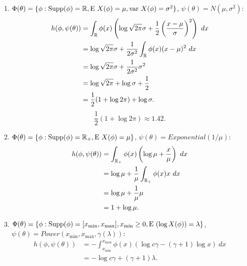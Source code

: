 \documentclass[10pt,a4paper]{article}
\theoremstyle{plain} \newtheorem{Lem}{Lemma}
\begin{document}
\begin{enumerate}

\item
$ \Phi(\theta) = \{\phi: \mathrm {Supp}(\phi)= \mathbb R, \mathrm E \  X(\phi)=\mu, \mathrm {var} \  X(\phi)=\sigma^2\}$, $\psi(\theta) = N(\mu,\sigma^2)$:
\begin{equation*}
\begin{split}
 h(\phi,\psi(\theta)) &= \int_\mathbb R \phi(x) \left(\log \sqrt {2 \pi} \sigma + \frac 1 2 \left(\frac {x - \mu} \sigma \right)^2 \right) \ dx \\
  &= \log \sqrt {2 \pi} \sigma + \frac 1 {2 \sigma^2} \int_\mathbb R \phi(x) (x - \mu)^2 \ dx \\
  &= \log \sqrt {2 \pi} \sigma + \frac 1 {2 \sigma^2} \sigma^2 \\
  &= \log \sqrt {2 \pi} + \log \sigma + \frac 1 2 \\
  &= \frac 1 2 (1 + \log 2 \pi) + \log \sigma.
\end{split}
\end{equation*}
$$ \frac 1 2 (1 + \log 2 \pi) \approx 1.42. $$

\item
$ \Phi(\theta) = \{\phi: \mathrm {Supp}(\phi)= \mathbb R_+, \mathrm E \  X(\phi)=\mu\}$, $\psi(\theta) = \mathit {Exponential}(1 / \mu)$:
\begin{equation*}
\begin{split}
 h(\phi,\psi(\theta)) &= \int_{\mathbb R_+} \phi(x) \left (\log \mu + \frac x \mu \right) \ dx \\
  &= \log \mu + \frac 1 \mu \int_{\mathbb R_+} \phi(x) x \ dx \\
  &= \log \mu + \frac 1 \mu \mu \\
  &= 1 + \log \mu.
\end{split}
\end{equation*}

\item
$ \Phi(\theta) = \{\phi: \mathrm {Supp}(\phi)= [x_{\mathrm {min}}, x_{\mathrm{max}}], x_{\mathrm {min}} \ge 0, \mathrm E \  (\log X(\phi))=\lambda\}$,
$\psi(\theta) = Power(x_{\mathrm {min}}, x_{\mathrm{max}},\gamma(\lambda))$:
\begin{equation*}
\begin{split}
 h(\phi,\psi(\theta)) &=
     - \int_{x_{\mathrm {min}}}^{x_{\mathrm {max}}} \phi(x) \left(\log c \gamma - (\gamma + 1) \log x \right) \ dx \\
  &= - \log c \gamma + (\gamma + 1) \lambda.
\end{split}
\end{equation*}

\end{enumerate}
\end{document}
